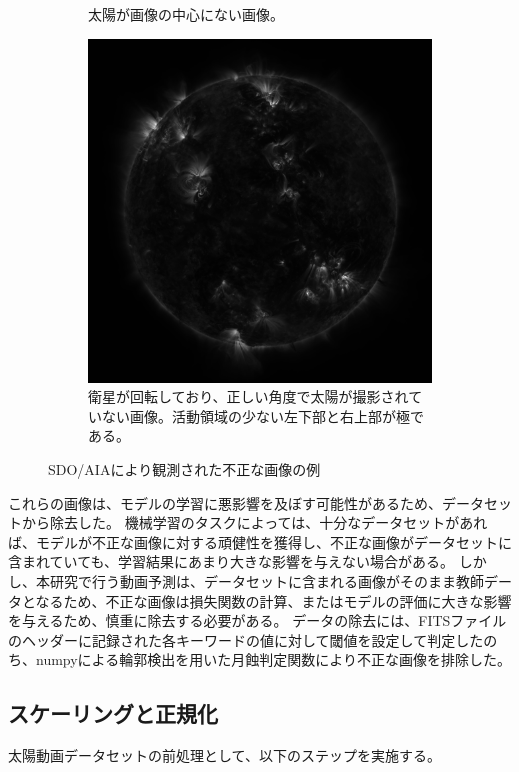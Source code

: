\begin{figure}[htbp]
\begin{subfigure}[b]{0.48\textwidth}
        \caption{太陽が画像の中心にない画像。}
    \end {subfigure}
    \begin{subfigure}[b]{0.48\textwidth}
        \includegraphics[width=\textwidth]{figures/data/bad_sample2.jpg}
        \caption{衛星が回転しており、正しい角度で太陽が撮影されていない画像。活動領域の少ない左下部と右上部が極である。}
    \end {subfigure}
    \hfill
    \caption{SDO/AIAにより観測された不正な画像の例}
    \label{fig:bad_aia_samples}
\end{figure}

これらの画像は、モデルの学習に悪影響を及ぼす可能性があるため、データセットから除去した。
機械学習のタスクによっては、十分なデータセットがあれば、モデルが不正な画像に対する頑健性を獲得し、不正な画像がデータセットに含まれていても、学習結果にあまり大きな影響を与えない場合がある。
しかし、本研究で行う動画予測は、データセットに含まれる画像がそのまま教師データとなるため、不正な画像は損失関数の計算、またはモデルの評価に大きな影響を与えるため、慎重に除去する必要がある。
データの除去には、FITSファイルのヘッダーに記録された各キーワードの値に対して閾値を設定して判定したのち、numpyによる輪郭検出を用いた月蝕判定関数により不正な画像を排除した。

\subsection{スケーリングと正規化}
    太陽動画データセットの前処理として、以下のステップを実施する。

